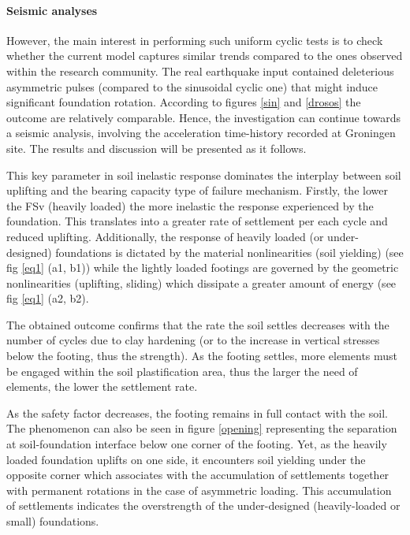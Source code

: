  \paragraph{Seismic analyses}
 However, the main interest in performing such uniform cyclic tests is to check whether the current model captures similar trends compared to the ones observed within the research community. The real earthquake input contained deleterious asymmetric pulses (compared to the sinusoidal cyclic one) that might induce significant foundation rotation. According to figures \ref{sin} and \ref{drosos} the outcome are relatively comparable. Hence, the investigation can continue towards a seismic analysis, involving the acceleration time-history recorded at Groningen site. The results and discussion will be presented as it follows.
 
 This key parameter in soil inelastic response dominates the interplay between soil uplifting and the bearing capacity type of failure mechanism. Firstly, the lower the FSv (heavily loaded) the more inelastic the response experienced by the foundation. This translates into a greater rate of settlement per each cycle and reduced uplifting. Additionally, the response of heavily loaded (or under-designed) foundations is dictated by the material nonlinearities (soil yielding) (see fig \ref{eq1} (a1, b1)) while the lightly loaded footings are governed by the geometric nonlinearities (uplifting, sliding) which dissipate a greater amount of energy (see fig \ref{eq1} (a2, b2).
 
 The obtained outcome confirms that the rate the soil settles decreases with the number of cycles due to clay hardening (or to the increase in vertical stresses below the footing, thus the strength). As the footing settles, more elements must be engaged within the soil plastification area, thus the larger the need of elements, the lower the settlement rate. 
 
 As the safety factor decreases, the footing remains in full contact with the soil. The phenomenon can also be seen in figure \ref{opening} representing the separation at soil-foundation interface below one corner of the footing. Yet, as the heavily loaded foundation uplifts on one side, it encounters soil yielding under the opposite corner which associates with the accumulation of settlements together with permanent rotations in the case of asymmetric loading. This accumulation of settlements indicates the overstrength of the under-designed (heavily-loaded or small) foundations.
 
